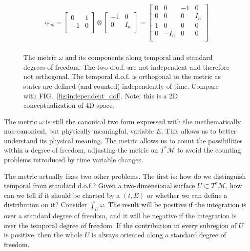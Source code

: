 \documentclass[aps,pra,10pt,twocolumn,floatfix,nofootinbib]{revtex4-1}
\numberwithin{equation}{section}
\theoremstyle{definition}
\begin{document}
\begin{align*}
\omega_{ab} =  \left[
\begin{array}{cc}
0 & 1 \\
-1 & 0 \\
\end{array}
\right] \otimes \left[
\begin{array}{cc}
-1 & 0 \\
0 & I_n \\
\end{array}
\right] =
\left[
\begin{array}{cccc}
0 & 0 & -1 & 0 \\
0 & 0 & 0 & I_n \\
1 & 0 & 0 & 0 \\
0 & -I_n & 0& 0 \\
\end{array}
\right] \\
\end{align*}

\begin{figure}
	
	\caption{The metric $\omega$ and its components along temporal and standard degrees of freedom. The two d.o.f. are not independent and therefore not orthogonal. The temporal d.o.f. is orthogonal to the metric as states are defined (and counted) independently of time. Compare with FIG.~\ref{fig:independent_dof}. Note: this is a 2D conceptualization of 4D space.}
	\label{fig:temporal_dof}
\end{figure}

The metric $\omega$ is still the canonical two form expressed with the mathematically non-canonical, but physically meaningful, variable $E$. This allows us to better understand its physical meaning. The metric allows us to count the possibilities within a degree of freedom, adjusting the metric on $T^*\mathcal{M}$ to avoid the counting problems introduced by time variable changes.

The metric actually fixes two other problems. The first is: how do we distinguish temporal from standard d.o.f.? Given a two-dimensional surface $U \subset T^*\mathcal{M}$, how can we tell if it should be charted by a $(t,E)$ or whether we can define a distribution on it? Consider $\int_U \omega$. The result will be positive if the integration is over a standard degree of freedom, and it will be negative if the integration is over the temporal degree of freedom. If the contribution in every subregion of $U$ is positive, then the whole $U$ is always oriented along a standard degree of freedom.
\end{document}
